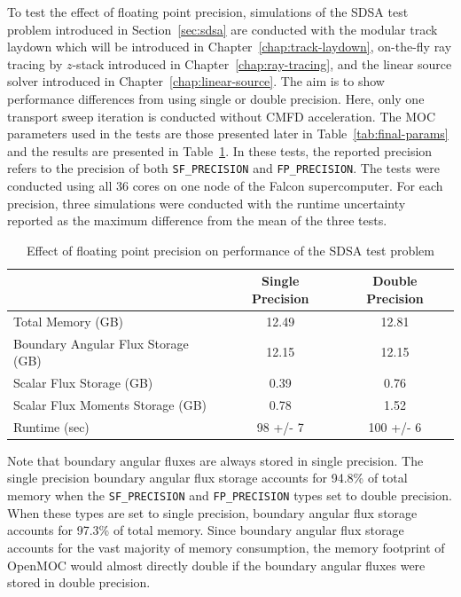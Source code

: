 To test the effect of floating point precision, simulations of the SDSA test problem introduced in Section~\ref{sec:sdsa} are conducted with the modular track laydown which will be introduced in Chapter~\ref{chap:track-laydown}, on-the-fly ray tracing by $z$-stack introduced in Chapter~\ref{chap:ray-tracing}, and the linear source solver introduced in Chapter~\ref{chap:linear-source}. The aim is to show performance differences from using single or double precision. Here, only one transport sweep iteration is conducted without \ac{CMFD} acceleration. The \ac{MOC} parameters used in the tests are those presented later in Table~\ref{tab:final-params} and the results are presented in Table~\ref{tab:precision-results}. In these tests, the reported precision refers to the precision of both \texttt{SF_PRECISION} and \texttt{FP_PRECISION}. The tests were conducted using all 36 cores on one node of the Falcon supercomputer. For each precision, three simulations were conducted with the runtime uncertainty reported as the maximum difference from the mean of the three tests.

\begin{table}[ht]
	\centering
	\caption{Effect of floating point precision on performance of the SDSA test problem}
	\medskip
	\begin{tabular}{lcc}
		\hline
		 & Single Precision & Double Precision \\
		 \hline
		Total Memory (GB) & 12.49 & 12.81 \\
		Boundary Angular Flux Storage (GB) & 12.15 & 12.15 \\
		Scalar Flux Storage (GB) & 0.39 & 0.76\\
		Scalar Flux Moments Storage (GB) & 0.78 & 1.52 \\
		Runtime (sec) & 98 +/- 7 & 100 +/- 6 \\
		\hline
	\end{tabular}
	\label{tab:precision-results}
\end{table}

Note that boundary angular fluxes are always stored in single precision. The single precision boundary angular flux storage accounts for 94.8\% of total memory when the \texttt{SF_PRECISION} and \texttt{FP_PRECISION} types set to double precision. When these types are set to single precision, boundary angular flux storage accounts for 97.3\% of total memory. Since boundary angular flux storage accounts for the vast majority of memory consumption, the memory footprint of OpenMOC would almost directly double if the boundary angular fluxes were stored in double precision.

